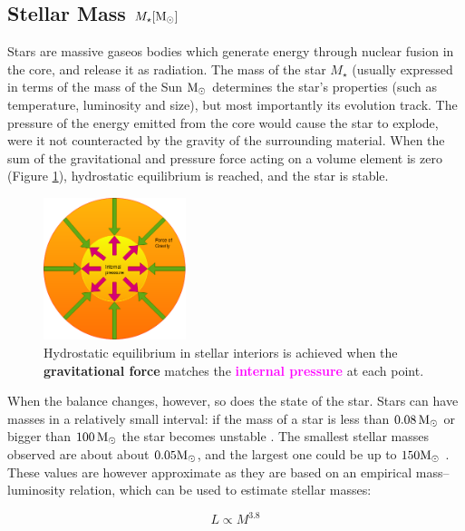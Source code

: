 \subsection{Stellar Mass $M_\star[\rm{M_\odot}]$}
Stars are massive gaseos bodies which generate energy through nuclear fusion in the core, and release it as radiation. The mass of the star $M_\star$ (usually expressed in terms of the mass of the Sun $\rm{M_\odot}$ determines the star's properties (such as temperature, luminosity and size), but most importantly its evolution track. The pressure of the energy emitted from the core would cause the star to explode, were it not counteracted by the gravity of the surrounding material. When the sum of the gravitational and pressure force acting on a volume element is zero (Figure \ref{fig:hydrostatic-equilibrium}), hydrostatic equilibrium is reached, and the star is stable. 

\begin{figure}[h]
		\centering
		\includegraphics[width=0.37\textwidth]{img/hydrostatic-equilibrium}%
  		\caption{ Hydrostatic equilibrium in stellar interiors is achieved when the \textbf{\textcolor{FrogGreen}{gravitational force}} matches the \textbf{\textcolor{Fuchsia}{internal pressure}} at each point.}
  		\label{fig:hydrostatic-equilibrium}
\end{figure}

When the balance changes, however, so does the state of the star. Stars can have masses in a relatively small interval: if the mass of a star is less than $\rm{0.08\,  M_\odot}$ or bigger than $\rm{100\,  M_\odot}$ the star becomes unstable \citep{Reese2005}. The smallest stellar masses observed are about about $0.05 \rm{M_\odot}$, and the largest one could be up to $150 \rm{M_\odot}$ \citep{Karttunen2017}. These values are however approximate as they are based on an empirical mass–luminosity relation, which can be used to estimate stellar masses: 

\begin{equation}
	L \propto M^{3.8}
\end{equation}


